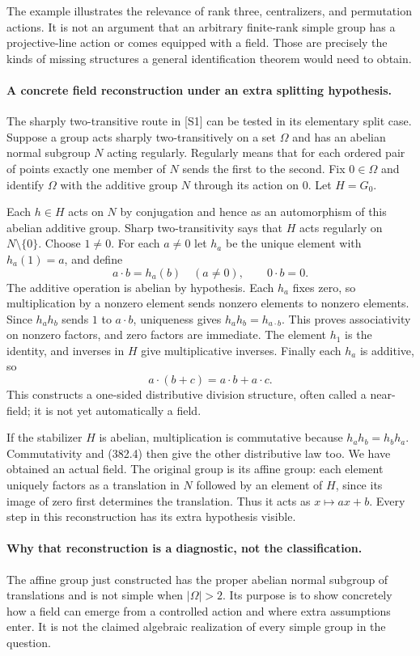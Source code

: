 \documentclass[11pt]{article}
\begin{document}
The example illustrates the relevance of rank three, centralizers,
and permutation actions. It is not an argument that an arbitrary
finite-rank simple group has a projective-line action or comes equipped
with a field. Those are precisely the kinds of missing structures a
general identification theorem would need to obtain.

\paragraph{A concrete field reconstruction under an extra splitting hypothesis.}
The sharply two-transitive route in [S1] can be tested in its elementary
split case. Suppose a group acts sharply two-transitively on a set
$\Omega$ and has an abelian normal subgroup $N$ acting regularly.
Regularly means that for each ordered pair of points exactly one
member of $N$ sends the first to the second. Fix $0\in\Omega$ and
identify $\Omega$ with the additive group $N$ through its action on
$0$. Let $H=G_0$.

Each $h\in H$ acts on $N$ by conjugation and hence as an automorphism
of this abelian additive group. Sharp two-transitivity says that $H$
acts regularly on $N\setminus\{0\}$. Choose $1\ne0$. For each
$a\ne0$ let $h_a$ be the unique element with $h_a(1)=a$, and define
\[
 a\cdot b=h_a(b)\quad(a\ne0),\qquad0\cdot b=0.
\]
The additive operation is abelian by hypothesis. Each $h_a$ fixes zero,
so multiplication by a nonzero element sends nonzero elements to
nonzero elements. Since $h_ah_b$ sends $1$ to $a\cdot b$, uniqueness
gives $h_ah_b=h_{a\cdot b}$. This proves associativity on nonzero
factors, and zero factors are immediate. The element $h_1$ is the
identity, and inverses in $H$ give multiplicative inverses.
Finally each $h_a$ is additive, so
\[
 a\cdot(b+c)=a\cdot b+a\cdot c.
 \tag{382.4}
\]
This constructs a one-sided distributive division structure, often
called a near-field; it is not yet automatically a field.

If the stabilizer $H$ is abelian, multiplication is commutative because
$h_ah_b=h_bh_a$. Commutativity and (382.4) then give the other
distributive law too. We have obtained an actual field. The original
group is its affine group: each element uniquely factors as a
translation in $N$ followed by an element of $H$, since its image of
zero first determines the translation. Thus it acts as $x\mapsto ax+b$.
Every step in this reconstruction has its extra hypothesis visible.

\paragraph{Why that reconstruction is a diagnostic, not the classification.}
The affine group just constructed has the proper abelian normal subgroup
of translations and is not simple when $|\Omega|>2$. Its purpose is
to show concretely how a field can emerge from a controlled action and
where extra assumptions enter. It is not the claimed algebraic
realization of every simple group in the question.
\end{document}
